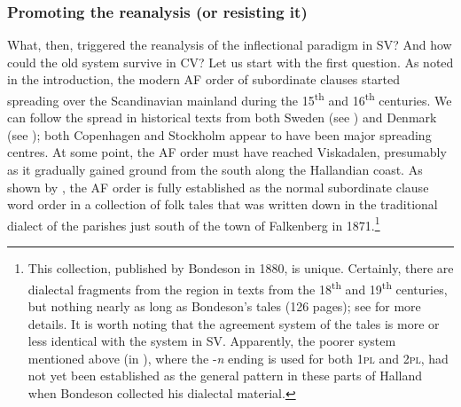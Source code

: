 \documentclass[output=paper,colorlinks,citecolor=brown,draft,draftmode]{langscibook}
\begin{document}
\subsubsection{Promoting the reanalysis (or resisting it)}\label{sec:petzell:4.3.3}


What, then, triggered the reanalysis of the inflectional paradigm in SV? And how could the old system survive in CV? Let us start with the first question. As noted in the introduction, the modern AF order of subordinate clauses started spreading over the Scandinavian mainland during the 15\textsuperscript{th} and 16\textsuperscript{th} centuries. We can follow the spread in historical texts from both Sweden (see \citealt{Falk1993}) and Denmark (see \citealt{Sundquist2003}); both Copenhagen and Stockholm appear to have been major spreading centres. At some point, the AF order must have reached Viskadalen, presumably as it gradually gained ground from the south along the Hallandian coast. As shown by \citet{Petzell2018}, the AF order is fully established as the normal subordinate clause word order in a collection of folk tales that was written down in the traditional dialect of the parishes just south of the town of Falkenberg in 1871.\footnote{This collection, published by Bondeson in 1880, is unique. Certainly, there are dialectal fragments from the region in texts from the 18\textsuperscript{th} and 19\textsuperscript{th} centuries, but nothing nearly as long as Bondeson’s tales (126 pages); see \citet{Petzell2018} for more details. It is worth noting that the agreement system of the tales is more or less identical with the system in SV. Apparently, the poorer system mentioned above (in ), where the -\textit{n} ending is used for both 1\textsc{pl} and 2\textsc{pl}, had not yet been established as the general pattern in these parts of Halland when Bondeson collected his dialectal material.}
\end{document}
